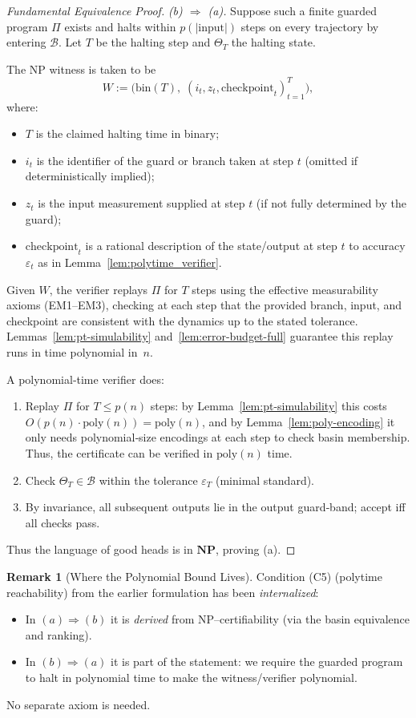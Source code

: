 \documentclass[12pt]{article}
\theoremstyle{definition}
\newtheorem{remark}{Remark}[section]
\theoremstyle{plain}
\begin{document}
\begin{proof}[Fundamental Equivalence Proof]
\medskip\noindent
\emph{(b) $\Rightarrow$ (a).}  
Suppose such a finite guarded program $\Pi$ exists and halts within $p(|\mathrm{input}|)$ steps on every trajectory by entering $\mathcal B$.  
Let $T$ be the halting step and $\Theta_T$ the halting state.  


The NP witness is taken to be
\[
W := \bigl(\mathrm{bin}(T),\; (i_t, z_t, \mathrm{checkpoint}_t)_{t=1}^T \bigr),
\]
where:
\begin{itemize}
  \item $T$ is the claimed halting time in binary;
  \item $i_t$ is the identifier of the guard or branch taken at step $t$ (omitted if deterministically implied);
  \item $z_t$ is the input measurement supplied at step $t$ (if not fully determined by the guard);
  \item $\mathrm{checkpoint}_t$ is a rational description of the state/output at step $t$ to accuracy $\varepsilon_t$ as in Lemma~\ref{lem:polytime_verifier}.
\end{itemize}
Given $W$, the verifier replays $\Pi$ for $T$ steps using the effective measurability axioms (EM1–EM3), checking at each step that the provided branch, input, and checkpoint are consistent with the dynamics up to the stated tolerance. Lemmas~\ref{lem:pt-simulability} and~\ref{lem:error-budget-full} guarantee this replay runs in time polynomial in~$n$.


A polynomial‑time verifier does:
\begin{enumerate}
  \item Replay $\Pi$ for $T\le p(n)$ steps: by Lemma~\ref{lem:pt-simulability} this costs $O(p(n)\cdot\mathrm{poly}(n))=\mathrm{poly}(n)$, and by Lemma~\ref{lem:poly-encoding} it only needs polynomial‐size encodings at each step to check basin membership.  Thus, the certificate can be verified in $\mathrm{poly}(n)$ time.
  \item Check $\Theta_T\in\mathcal B$ within the tolerance $\varepsilon_T$ (minimal standard).
  \item By invariance, all subsequent outputs lie in the output guard‑band; accept iff all checks pass.
\end{enumerate}
Thus the language of good heads is in $\mathbf{NP}$, proving (a).
\end{proof}

\begin{remark}[Where the Polynomial Bound Lives]
Condition (C5) (polytime reachability) from the earlier formulation has been \emph{internalized}:
\begin{itemize}
  \item In $(a)\Rightarrow(b)$ it is \emph{derived} from NP–certifiability (via the basin equivalence and ranking).
  \item In $(b)\Rightarrow(a)$ it is part of the statement: we require the guarded program to halt in polynomial time to make the witness/verifier polynomial.
\end{itemize}
No separate axiom is needed.
\end{remark}
\end{document}
